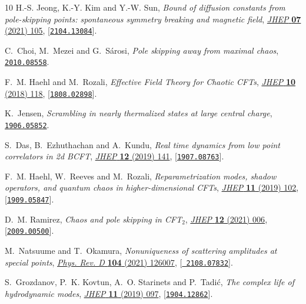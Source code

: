 \documentclass[11pt,a4paper]{article}
\begin{document}
\begin{thebibliography}{10}
H.-S. Jeong, K.-Y. Kim and Y.-W. Sun, \emph{{Bound of diffusion constants from
  pole-skipping points: spontaneous symmetry breaking and magnetic field}},
  \href{http://dx.doi.org/10.1007/JHEP07(2021)105}{\emph{JHEP} {\bf 07} (2021)
  105}, [\href{http://arxiv.org/abs/2104.13084}{{\tt 2104.13084}}].

C.~Choi, M.~Mezei and G.~S\'arosi, \emph{{Pole skipping away from maximal
  chaos}},  \href{http://arxiv.org/abs/2010.08558}{{\tt 2010.08558}}.

F.~M. Haehl and M.~Rozali, \emph{{Effective Field Theory for Chaotic CFTs}},
  \href{http://dx.doi.org/10.1007/JHEP10(2018)118}{\emph{JHEP} {\bf 10} (2018)
  118}, [\href{http://arxiv.org/abs/1808.02898}{{\tt 1808.02898}}].

K.~Jensen, \emph{{Scrambling in nearly thermalized states at large central
  charge}},  \href{http://arxiv.org/abs/1906.05852}{{\tt 1906.05852}}.

S.~Das, B.~Ezhuthachan and A.~Kundu, \emph{{Real time dynamics from low point
  correlators in 2d BCFT}},
  \href{http://dx.doi.org/10.1007/JHEP12(2019)141}{\emph{JHEP} {\bf 12} (2019)
  141}, [\href{http://arxiv.org/abs/1907.08763}{{\tt 1907.08763}}].

F.~M. Haehl, W.~Reeves and M.~Rozali, \emph{{Reparametrization modes, shadow
  operators, and quantum chaos in higher-dimensional CFTs}},
  \href{http://dx.doi.org/10.1007/JHEP11(2019)102}{\emph{JHEP} {\bf 11} (2019)
  102}, [\href{http://arxiv.org/abs/1909.05847}{{\tt 1909.05847}}].

D.~M. Ramirez, \emph{{Chaos and pole skipping in CFT$_{2}$}},
  \href{http://dx.doi.org/10.1007/JHEP12(2021)006}{\emph{JHEP} {\bf 12} (2021)
  006}, [\href{http://arxiv.org/abs/2009.00500}{{\tt 2009.00500}}].

M.~Natsuume and T.~Okamura, \emph{{Nonuniqueness of scattering amplitudes at
  special points}},
  \href{http://dx.doi.org/10.1103/PhysRevD.104.126007}{\emph{Phys. Rev. D} {\bf
  104} (2021) 126007}, [\href{http://arxiv.org/abs/2108.07832}{{\tt
  2108.07832}}].

S.~Grozdanov, P.~K. Kovtun, A.~O. Starinets and P.~Tadi\'c, \emph{{The complex
  life of hydrodynamic modes}},
  \href{http://dx.doi.org/10.1007/JHEP11(2019)097}{\emph{JHEP} {\bf 11} (2019)
  097}, [\href{http://arxiv.org/abs/1904.12862}{{\tt 1904.12862}}].


\end{thebibliography}
\end{document}
